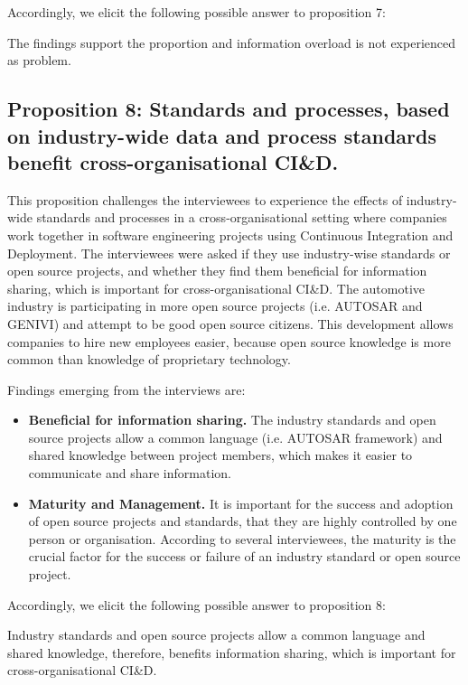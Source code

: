 Accordingly, we elicit the following possible answer to proposition 7:

The findings support the proportion and information overload is not experienced as problem.



\subsection{Proposition 8: Standards and processes, based on industry-wide data and process standards benefit cross-organisational CI\&D.}

This proposition challenges the interviewees to experience the effects of industry-wide standards and processes in a cross-organisational setting where companies work together in software engineering projects using Continuous Integration and Deployment. The interviewees were asked if they use industry-wise standards or open source projects, and whether they find them beneficial for information sharing, which is important for cross-organisational CI\&D. The automotive industry is participating in more open source projects (i.e. AUTOSAR and GENIVI) and attempt to be good open source citizens. This development allows companies to hire new employees easier, because open source knowledge is more common than knowledge of proprietary technology.

Findings emerging from the interviews are:

\begin{itemize}
\item {\bf Beneficial for information sharing.} The industry standards and open source projects allow a common language (i.e. AUTOSAR framework) and shared knowledge between project members, which makes it easier to communicate and share information.
\item {\bf Maturity and Management.} It is important for the success and adoption of open source projects and standards, that they are highly controlled by one person or organisation. According to several interviewees, the maturity is the crucial factor for the success or failure of an industry standard or open source project.
\end{itemize}

Accordingly, we elicit the following possible answer to proposition 8:

Industry standards and open source projects allow a common language and shared knowledge, therefore, benefits information sharing, which is important for cross-organisational CI\&D.






%
